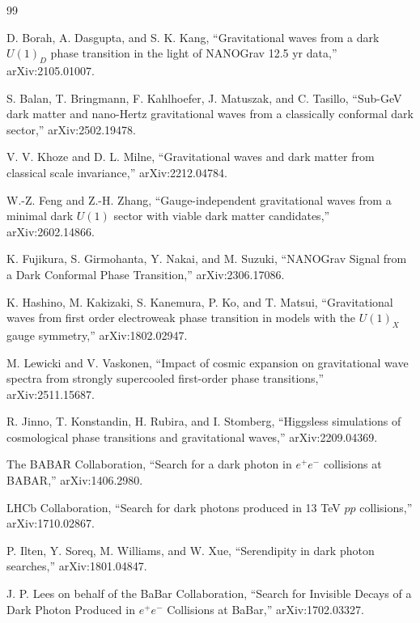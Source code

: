 \documentclass[11pt]{article}
\begin{document}
\begin{thebibliography}{99}

D. Borah, A. Dasgupta, and S. K. Kang,
``Gravitational waves from a dark \(U(1)_D\) phase transition in the light of NANOGrav 12.5 yr data,''
arXiv:2105.01007.

S. Balan, T. Bringmann, F. Kahlhoefer, J. Matuszak, and C. Tasillo,
``Sub-GeV dark matter and nano-Hertz gravitational waves from a classically conformal dark sector,''
arXiv:2502.19478.

V. V. Khoze and D. L. Milne,
``Gravitational waves and dark matter from classical scale invariance,''
arXiv:2212.04784.

W.-Z. Feng and Z.-H. Zhang,
``Gauge-independent gravitational waves from a minimal dark \(U(1)\) sector with viable dark matter candidates,''
arXiv:2602.14866.

K. Fujikura, S. Girmohanta, Y. Nakai, and M. Suzuki,
``NANOGrav Signal from a Dark Conformal Phase Transition,''
arXiv:2306.17086.

K. Hashino, M. Kakizaki, S. Kanemura, P. Ko, and T. Matsui,
``Gravitational waves from first order electroweak phase transition in models with the \(U(1)_X\) gauge symmetry,''
arXiv:1802.02947.

M. Lewicki and V. Vaskonen,
``Impact of cosmic expansion on gravitational wave spectra from strongly supercooled first-order phase transitions,''
arXiv:2511.15687.

R. Jinno, T. Konstandin, H. Rubira, and I. Stomberg,
``Higgsless simulations of cosmological phase transitions and gravitational waves,''
arXiv:2209.04369.

The BABAR Collaboration,
``Search for a dark photon in \(e^+e^-\) collisions at BABAR,''
arXiv:1406.2980.

LHCb Collaboration,
``Search for dark photons produced in 13 TeV \(pp\) collisions,''
arXiv:1710.02867.

P. Ilten, Y. Soreq, M. Williams, and W. Xue,
``Serendipity in dark photon searches,''
arXiv:1801.04847.

J. P. Lees on behalf of the BaBar Collaboration,
``Search for Invisible Decays of a Dark Photon Produced in \(e^+e^-\) Collisions at BaBar,''
arXiv:1702.03327.


\end{thebibliography}
\end{document}
